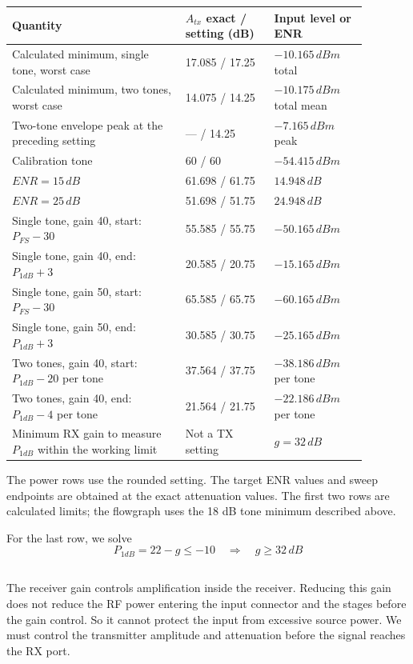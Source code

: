 \documentclass[]{article}
\begin{document}
    {\small
    \renewcommand{\arraystretch}{1.25}
    \begin{longtable}{|p{0.43\linewidth}|p{0.22\linewidth}|p{0.23\linewidth}|}
    \hline
    Quantity & $A_{tx}$ exact / setting (dB) & Input level or ENR \\ \hline
    Calculated minimum, single tone, worst case & 17.085 / 17.25 & $-10.165\,dBm$ total \\ \hline
    Calculated minimum, two tones, worst case & 14.075 / 14.25 & $-10.175\,dBm$ total mean \\ \hline
    Two-tone envelope peak at the preceding setting & --- / 14.25 & $-7.165\,dBm$ peak \\ \hline
    Calibration tone & 60 / 60 & $-54.415\,dBm$ \\ \hline
    $ENR=15\,dB$ & 61.698 / 61.75 & $14.948\,dB$ \\ \hline
    $ENR=25\,dB$ & 51.698 / 51.75 & $24.948\,dB$ \\ \hline
    Single tone, gain 40, start: $P_{FS}-30$ & 55.585 / 55.75 & $-50.165\,dBm$ \\ \hline
    Single tone, gain 40, end: $P_{1dB}+3$ & 20.585 / 20.75 & $-15.165\,dBm$ \\ \hline
    Single tone, gain 50, start: $P_{FS}-30$ & 65.585 / 65.75 & $-60.165\,dBm$ \\ \hline
    Single tone, gain 50, end: $P_{1dB}+3$ & 30.585 / 30.75 & $-25.165\,dBm$ \\ \hline
    Two tones, gain 40, start: $P_{1dB}-20$ per tone & 37.564 / 37.75 & $-38.186\,dBm$ per tone \\ \hline
    Two tones, gain 40, end: $P_{1dB}-4$ per tone & 21.564 / 21.75 & $-22.186\,dBm$ per tone \\ \hline
    Minimum RX gain to measure $P_{1dB}$ within the working limit & Not a TX setting & $g=32\,dB$ \\ \hline
    \end{longtable}
    }
    The power rows use the rounded setting. The target ENR values and sweep endpoints are obtained at the exact attenuation values. The first two rows are calculated limits; the flowgraph uses the 18 dB tone minimum described above.

    For the last row, we solve
    \begin{equation*}
        P_{1dB}=22-g\leq-10
        \quad\Rightarrow\quad \boxed{g\geq32\,dB}
    \end{equation*}

    \subsection{}
    The receiver gain controls amplification inside the receiver. Reducing this gain does not reduce the RF power entering the input connector and the stages before the gain control. So it cannot protect the input from excessive source power. We must control the transmitter amplitude and attenuation before the signal reaches the RX port.
\end{document}

